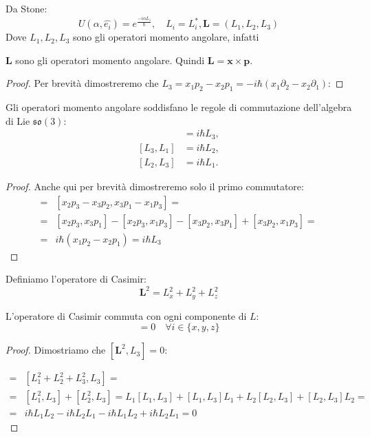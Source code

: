 Da Stone:
\begin{equation*}
U(\alpha, \hat{e_i}) = e^{\frac{-i\alpha L_i}{\hbar} }, \quad L_i=L_i^*, \mathbf{L}=(L_1, L_2, L_3)
\end{equation*}
Dove $L_1, L_2, L_3$ sono gli operatori momento angolare, infatti 

\begin{proposition}
    $\mathbf{L}$ sono gli operatori momento angolare. Quindi $\mathbf{L}= \mathbf{x} \times \mathbf{p}$.
\end{proposition}

\begin{proof}
    Per brevità dimostreremo che $L_3 = x_1 p_2 - x_2 p_1 = -i \hbar (x_1 \partial_2 - x_2 \partial_1)$: %
\end{proof}

\begin{proposition}
Gli operatori momento angolare soddisfano le regole di commutazione dell'algebra di Lie $\mathfrak{so}(3)$:
\begin{align*}
[L_1, L_2] &= i\hbar L_3, \\
[L_3, L_1] &= i\hbar L_2, \\
[L_2, L_3] &= i\hbar L_1.
\end{align*}
\end{proposition}
\begin{proof}
    Anche qui per brevità dimostreremo solo il primo commutatore:
\begin{align*}
    [L_1, L_2] =& [x_2 p_3 - x_3 p_2, x_3 p_1 - x_1 p_3] =\\
=& [x_2p_3, x_3p_1] - [x_2p_3, x_1p_3] - [x_3p_2, x_3p_1] + [x_3p_2, x_1p_3] =\\
=& i\hbar(x_1p_2 - x_2p_1) = i\hbar L_3
\end{align*} 
\end{proof}

Definiamo l'operatore di Casimir:
\begin{equation*}
\mathbf{L}^2 = L_x^2 + L_y^2 + L_z^2
\end{equation*}

\begin{proposition}
    L'operatore di Casimir commuta con ogni componente di $L$:
\begin{equation*}
[\mathbf{L}^2, L_i] = 0 \quad \forall i \in \{x, y, z\}
\end{equation*}
\end{proposition}

\begin{proof}
    Dimostriamo che $[\mathbf{L}^2, L_3] = 0$:

 \begin{align*}
    [\mathbf{L}^2, L_3] =& [L_1^2 + L_2^2 + L_3^2, L_3] = \\
  =& [L_1^2, L_3] + [L_2^2, L_3]= L_1[L_1, L_3] + [L_1, L_3]L_1 + L_2[L_2, L_3] + [L_2, L_3]L_2 = \\ 
=&  i\hbar L_1L_2 - i\hbar L_2L_1 - i\hbar L_1L_2 + i\hbar L_2L_1 = 0
\end{align*}
\end{proof}

